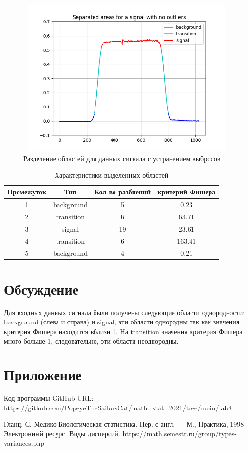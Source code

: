 \documentclass{article}
\begin{document}
	\begin{figure}[H]
		\centering
		\includegraphics[width = 13cm, height = 8cm]{separated.png}
		\caption{Разделение областей для данных сигнала с устранением выбросов}
		\label{fig:sP}
	\end{figure}

\begin{table}[H]
    \centering
    \begin{tabular}{|c|c|c|c|}
    \hline
        Промежуток & Тип & Кол-во разбиений & критерий Фишера  \\ \hline
        1 & background & 5 & 0.23\\ \hline
        2 & transition & 6 & 63.71 \\ \hline
        3 & signal & 19 & 23.61\\ \hline
        4 & transition & 6 & 163.41\\ \hline
        5 & background & 4 & 0.21\\ \hline
    \end{tabular}
    \caption{Характеристики выделенных областей}
    \label{tab:my_label}
\end{table}

\section{Обсуждение}
 Для входных данных сигнала были получены следующие области
однородности: background (слева и справа) и signal, эти области
однородны так как значения критерия Фишера находится вблизи 1.
\newline На transition значения критерия Фишера много больше 1,
следовательно, эти области неоднородны.

\section{Приложение}
\noindent Код программы GitHub URL:\\
\newline https://github.com/PopeyeTheSailorsCat/math\_stat\_2021/tree/main/lab8

\begin{thebibliography}{9}
 Гланц, С. Медико-Биологическая статистика. Пер. с англ. — М.,
Практика, 1998
 Электронный ресурс. Виды дисперсий.
https://math.semestr.ru/group/types-variances.php
\end{thebibliography}
\end{document}
